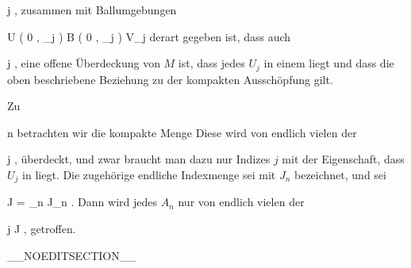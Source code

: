 {{ {}
 {j \in \N} {}
 {} {} {} {,}
zusammen mit Ballumgebungen

\mavergleichskettedisp
{\vergleichskette
{ U \left(   0 , \delta_j   \right)
}
{ \subset} { B  \left(  0 , \epsilon_j  \right)
}
{ \subset} { V_j
}
{ } {
}
{ } {
}
}
{}{}{}
derart gegeben ist, dass auch

 {}
 {j \in \N} {}
 {} {} {} {,}
eine offene Überdeckung von $M$ ist, dass jedes $U_j$ in einem
 liegt und dass die oben beschriebene Beziehung zu der kompakten Ausschöpfung gilt.}
{}
{Zu

\mavergleichskette
{\vergleichskette
{ n
}
{ \in }{ \N
}
{  }{
}
{    }{
}
{   }{
}
}
{}{}{}
betrachten wir die kompakte Menge
 Diese wird von endlich vielen der

 {}
 {j \in \N} {}
 {} {} {} {,}
überdeckt, und zwar braucht man dazu nur Indizes $j$ mit der Eigenschaft, dass $U_j$ in
 liegt. Die zugehörige endliche Indexmenge sei mit $J_n$ bezeichnet, und sei

\mavergleichskette
{\vergleichskette
{ J
}
{ = }{ \bigcup_{n \in \N} J_n
}
{  }{
}
{    }{
}
{   }{
}
}
{}{}{.}
Dann wird jedes $A_n$ nur von endlich vielen der

 {}
 {j \in J} {}
 {} {} {} {,}
getroffen.}
{}

}

__NOEDITSECTION__

